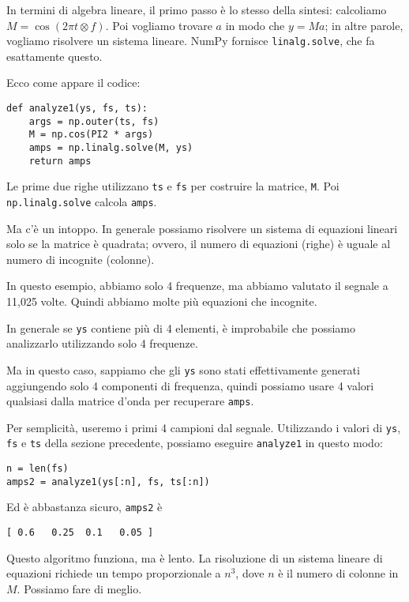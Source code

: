 \documentclass[12pt,a4paper]{book}
\begin{document}
In termini di algebra lineare, il primo passo è lo stesso della sintesi: calcoliamo $M = \cos (2 \pi t \otimes f)$. Poi vogliamo trovare $a$ in modo che $y = M a$; in altre parole, vogliamo risolvere un sistema lineare. NumPy fornisce {\tt linalg.solve}, che fa esattamente questo.

Ecco come appare il codice:

\begin{verbatim} 
def analyze1(ys, fs, ts):
    args = np.outer(ts, fs)
    M = np.cos(PI2 * args)
    amps = np.linalg.solve(M, ys)
    return amps
 \end{verbatim} 

Le prime due righe utilizzano {\tt ts} e {\tt fs} per costruire la matrice, {\tt M}. Poi {\tt np.linalg.solve} calcola {\tt amps}.

Ma c'è un intoppo. In generale possiamo risolvere un sistema di equazioni lineari solo se la matrice è quadrata; ovvero, il numero di equazioni (righe) è uguale al numero di incognite (colonne).

In questo esempio, abbiamo solo 4 frequenze, ma abbiamo valutato il segnale a 11,025 volte. Quindi abbiamo molte più equazioni che incognite.

In generale se {\tt ys} contiene più di 4 elementi, è improbabile che possiamo analizzarlo utilizzando solo 4 frequenze.

Ma in questo caso, sappiamo che gli {\tt ys} sono stati effettivamente generati aggiungendo solo 4 componenti di frequenza, quindi possiamo usare 4 valori qualsiasi dalla matrice d'onda per recuperare {\tt amps}.

Per semplicità, useremo i primi 4 campioni dal segnale. Utilizzando i valori di {\tt ys}, {\tt fs} e {\tt ts} della sezione precedente, possiamo eseguire {\tt analyze1} in questo modo:

\begin{verbatim} 
n = len(fs)
amps2 = analyze1(ys[:n], fs, ts[:n])
 \end{verbatim} 

Ed è abbastanza sicuro, {\tt amps2} è

\begin{verbatim} 
[ 0.6   0.25  0.1   0.05 ]
 \end{verbatim} 

Questo algoritmo funziona, ma è lento. La risoluzione di un sistema lineare di equazioni richiede un tempo proporzionale a $n^3$, dove $n$ è il numero di colonne in $M$. Possiamo fare di meglio.
\end{document}
